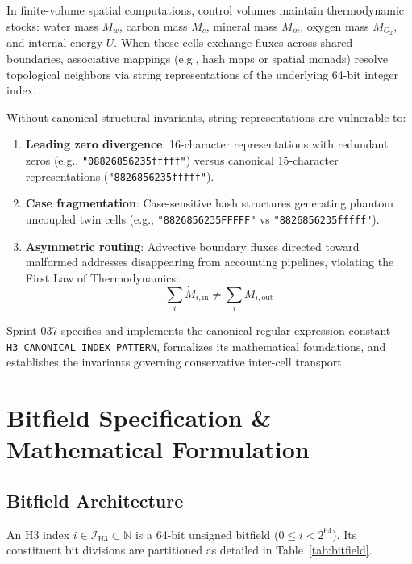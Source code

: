 \documentclass[10pt,journal,compsoc]{IEEEtran}
\begin{document}
In finite-volume spatial computations, control volumes maintain thermodynamic stocks: water mass $M_w$, carbon mass $M_c$, mineral mass $M_m$, oxygen mass $M_{O_2}$, and internal energy $U$. When these cells exchange fluxes across shared boundaries, associative mappings (e.g., hash maps or spatial monads) resolve topological neighbors via string representations of the underlying 64-bit integer index.

Without canonical structural invariants, string representations are vulnerable to:
\begin{enumerate}
    \item \textbf{Leading zero divergence}: 16-character representations with redundant zeros (e.g., \texttt{"08826856235fffff"}) versus canonical 15-character representations (\texttt{"8826856235fffff"}).
    \item \textbf{Case fragmentation}: Case-sensitive hash structures generating phantom uncoupled twin cells (e.g., \texttt{"8826856235FFFFF"} vs \texttt{"8826856235fffff"}).
    \item \textbf{Asymmetric routing}: Advective boundary fluxes directed toward malformed addresses disappearing from accounting pipelines, violating the First Law of Thermodynamics:
    \begin{equation}
        \sum_{i} \dot{M}_{i, \text{in}} \neq \sum_{i} \dot{M}_{i, \text{out}}
    \end{equation}
\end{enumerate}

Sprint 037 specifies and implements the canonical regular expression constant \texttt{H3\_CANONICAL\_INDEX\_PATTERN}, formalizes its mathematical foundations, and establishes the invariants governing conservative inter-cell transport.

\section{Bitfield Specification \& Mathematical Formulation}

\subsection{Bitfield Architecture}
An H3 index $i \in \mathcal{I}_{\text{H3}} \subset \mathbb{N}$ is a 64-bit unsigned bitfield ($0 \le i < 2^{64}$). Its constituent bit divisions are partitioned as detailed in Table~\ref{tab:bitfield}.
\end{document}
